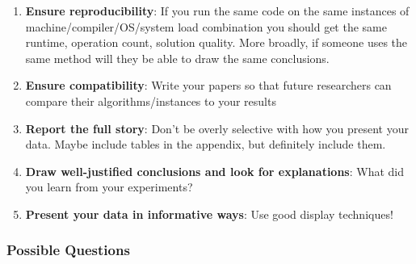 \begin{enumerate}
    \item \textbf{Ensure reproducibility}: If you run the same code on the same instances of machine/compiler/OS/system load combination you should get the same runtime, operation count, solution quality. More broadly, if someone uses the same method will they be able to draw the same conclusions.
    
    \item \textbf{Ensure compatibility}: Write your papers so that future researchers can compare their algorithms/instances to your results
    
    \item \textbf{Report the full story}: Don't be overly selective with how you present your data. Maybe include tables in the appendix, but definitely include them.
    
    \item \textbf{Draw well-justified conclusions and look for explanations}: What did you learn from your experiments?
    
    \item \textbf{Present your data in informative ways}: Use good display techniques!
\end{enumerate}

\subsubsection{Possible Questions}

